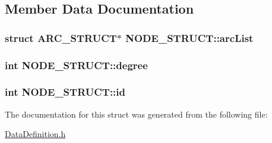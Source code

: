 \subsection{Member Data Documentation}
\hypertarget{structNODE__STRUCT_a0a9adf25cd6c875ce28817790e2d93f7}{
\subsubsection[{arc\-List}]{\setlength{\rightskip}{0pt plus 5cm}struct {\bf A\-R\-C\-\_\-\-S\-T\-R\-U\-C\-T}$\ast$ N\-O\-D\-E\-\_\-\-S\-T\-R\-U\-C\-T\-::arc\-List}}\label{structNODE__STRUCT_a0a9adf25cd6c875ce28817790e2d93f7}
\hypertarget{structNODE__STRUCT_a4d119525d60341ec5fb1c0f040adb867}{
\subsubsection[{degree}]{\setlength{\rightskip}{0pt plus 5cm}int N\-O\-D\-E\-\_\-\-S\-T\-R\-U\-C\-T\-::degree}}\label{structNODE__STRUCT_a4d119525d60341ec5fb1c0f040adb867}
\hypertarget{structNODE__STRUCT_a4386a981b07860b03b46d11c5280445d}{
\subsubsection[{id}]{\setlength{\rightskip}{0pt plus 5cm}int N\-O\-D\-E\-\_\-\-S\-T\-R\-U\-C\-T\-::id}}\label{structNODE__STRUCT_a4386a981b07860b03b46d11c5280445d}


The documentation for this struct was generated from the following file\-:\begin{DoxyCompactItemize}
\item 
\hyperlink{DataDefinition_8h}{Data\-Definition.\-h}\end{DoxyCompactItemize}
